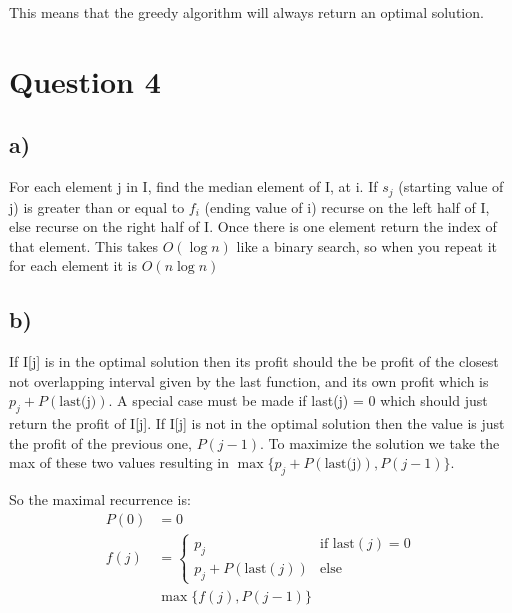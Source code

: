 \documentclass[12pt]{article}
\begin{document}
This means that the greedy algorithm will always return an optimal solution.


\section*{Question 4}
\subsection*{a)}
For each element j in I, find the median element of I, at i. If $s_j$ (starting value of j) is greater than or equal to $f_i$ (ending value of i) recurse on the left half of I, else recurse on the right half of I. Once there is one element return the index of that element. This takes $O(\log n)$ like a binary search, so when you repeat it for each element it is $O(n\log n)$

\subsection*{b)}
If I[j] is in the optimal solution then its profit should the be profit of the closest not overlapping interval given by the last function, and its own profit which is $p_j + P(\text{last(j)})$. A special case must be made if last(j) = 0 which should just return the profit of I[j]. If I[j] is not in the optimal solution then the value is just the profit of the previous one, $P(j-1)$. To maximize the solution we take the max of these two values resulting in $\max \{ p_j + P(\text{last(j)}), P(j-1)\}$.

So the maximal recurrence is:
\begin{align*}
    P(0) &= 0\\
    f(j) &= \begin{cases}
    p_j & \text{if last}(j) = 0\\
    p_j + P(\text{last}(j)) & \text{else}
    \end{cases}\\
    &\max \{f(j), P(j-1)\}
\end{align*}
\end{document}
